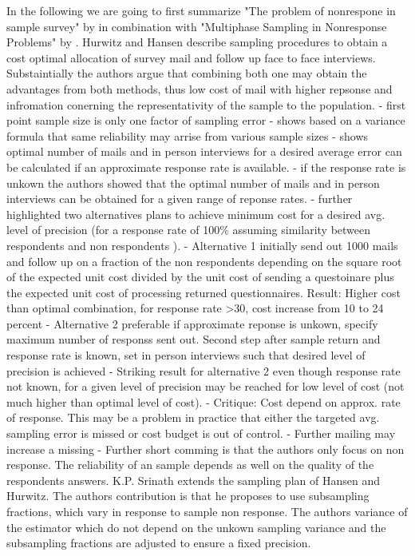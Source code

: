 In the following we are going to first summarize "The problem of nonrespone in sample survey" by \cite{Hurwitz}in combination with "Multiphase Sampling in Nonresponse Problems" by \cite{Srinath}. 
Hurwitz and Hansen describe sampling procedures to obtain a cost optimal allocation of survey mail and follow up face to face interviews. Substaintially the authors argue that combining both one may obtain the advantages from both methods, thus low cost of mail with higher repsonse and infromation conerning the representativity of the sample to the population. 
- first point sample size is only one factor of sampling error
- shows based on a variance formula that same reliability may arrise from various sample sizes
- shows optimal number of mails and in person interviews for a desired average error can be calculated if an approximate response rate is available.
- if the response rate is unkown the authors showed that the optimal number of mails and in person interviews can be obtained for a given range of reponse rates.
-  further highlighted two alternatives plans to achieve minimum cost for a desired avg. level of precision (for a response rate of 100\% assuming similarity between respondents and non respondents ).
- Alternative 1 initially send out 1000 mails and follow up on a fraction of the non respondents depending on the square root of the expected unit cost divided by the unit cost of sending a questoinare plus the expected unit cost of processing returned questionnaires.
  Result: Higher cost than optimal combination, for response rate >30, cost increase from 10 to 24 percent
- Alternative 2 preferable if approximate reponse is unkown, specify maximum number of responss sent out. Second step after sample return and response rate is known, set in person interviews such that desired level of precision is achieved
- Striking result for alternative 2 even though response rate not known, for a given level of precision may be reached for low level of cost (not much higher than optimal level of cost). 
- Critique: Cost depend on approx. rate of response. This may be a problem in practice that either the targeted avg. sampling error is missed or cost budget is out of control. 
- Further mailing may increase a missing
- Further short comming is that the authors only focus on non response. The reliability of an sample depends as well on the quality of the respondents answers. 
K.P. Srinath extends the sampling plan of Hansen and Hurwitz. The authors contribution is that he proposes to use subsampling fractions, which vary in response to sample non response. The authors variance of the estimator which do not depend on the unkown sampling variance and the subsampling fractions are adjusted to ensure a fixed precision.  

